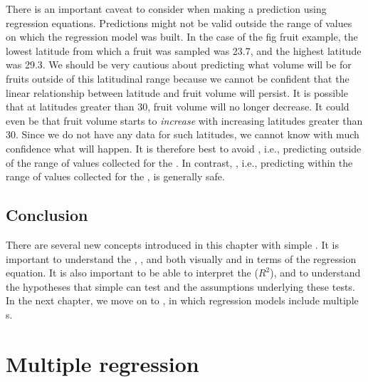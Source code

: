 \documentclass[
  openany]{krantz}
\begin{document}
There is an important caveat to consider when making a prediction using regression equations.
Predictions might not be valid outside the range of  values on which the regression model was built.
In the case of the fig fruit example, the lowest latitude from which a fruit was sampled was 23.7, and the highest latitude was 29.3.
We should be very cautious about predicting what volume will be for fruits outside of this latitudinal range because we cannot be confident that the linear relationship between latitude and fruit volume will persist.
It is possible that at latitudes greater than 30, fruit volume will no longer decrease.
It could even be that fruit volume starts to \emph{increase} with increasing latitudes greater than 30.
Since we do not have any data for such latitudes, we cannot know with much confidence what will happen.
It is therefore best to avoid \textbf{}, i.e., predicting outside of the range of values collected for the .
In contrast, \textbf{}, i.e., predicting within the range of values collected for the , is generally safe.

\hypertarget{conclusion}{%
\section{Conclusion}\label{conclusion}}

There are several new concepts introduced in this chapter with simple .
It is important to understand the , , and  both visually and in terms of the regression equation.
It is also important to be able to interpret the  (\(R^{2}\)), and to understand the hypotheses that simple  can test and the assumptions underlying these tests.
In the next chapter, we move on to , in which regression models include multiple s.

\hypertarget{Chapter_33}{%
\chapter{Multiple regression}\label{Chapter_33}}
\end{document}

